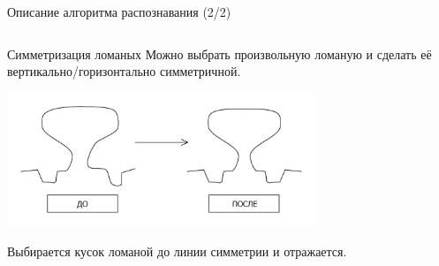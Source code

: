 \documentclass[utf8,xcolor=table]{beamer}
\begin{document}
\begin{frame}[t]{Описание алгоритма распознавания (2/2)}
\begin{columns}[T]
\begin{column}{.4\textwidth}
  \end{column}
  \end{columns}
\end{frame}

\begin{frame}[t]{Симметризация ломаных}
  Можно выбрать произвольную ломаную и сделать её вертикально/горизонтально симметричной.
  \begin{center}
    \includegraphics[height=4cm]{demo_symm}
  \end{center}
  Выбирается кусок ломаной до линии симметрии и отражается.
\end{frame}
\end{document}
